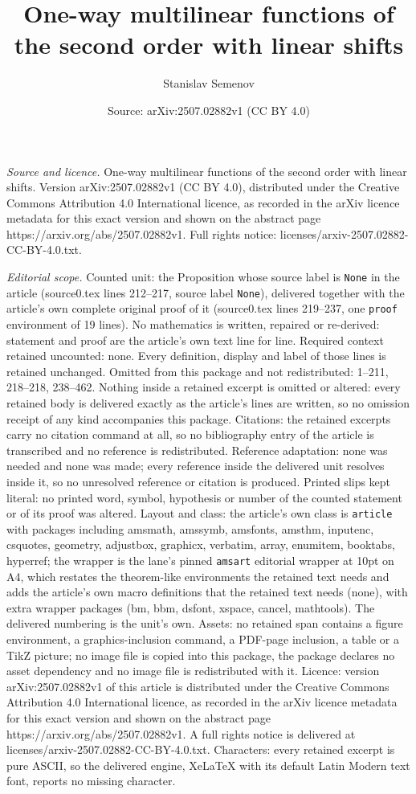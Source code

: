 \documentclass[10pt,a4paper]{amsart}
\title[One-way multilinear functions of the second order with linea]{One-way multilinear functions of the second order with linear shifts}
\author{Stanislav Semenov}
\date{Source: arXiv:2507.02882v1 (CC BY 4.0)}
\begin{document}
\maketitle

\noindent\emph{Source and licence.} One-way multilinear functions of the second order with linear shifts. Version arXiv:2507.02882v1 (CC BY 4.0), distributed under the Creative Commons Attribution 4.0 International licence, as recorded in the arXiv licence metadata for this exact version and shown on the abstract page https://arxiv.org/abs/2507.02882v1. Full rights notice: licenses/arxiv-2507.02882-CC-BY-4.0.txt.\par\smallskip

\noindent\textit{Editorial scope.} Counted unit: the Proposition whose source label is \texttt{None} in the article (source0.tex lines 212--217, source label \texttt{None}), delivered together with the article's own complete original proof of it (source0.tex lines 219--237, one \texttt{proof} environment of 19 lines). No mathematics is written, repaired or re-derived: statement and proof are the article's own text line for line. Required context retained uncounted: none. Every definition, display and label of those lines is retained unchanged. Omitted from this package and not redistributed: 1--211, 218--218, 238--462. Nothing inside a retained excerpt is omitted or altered: every retained body is delivered exactly as the article's lines are written, so no omission receipt of any kind accompanies this package. Citations: the retained excerpts carry no citation command at all, so no bibliography entry of the article is transcribed and no reference is redistributed. Reference adaptation: none was needed and none was made; every reference inside the delivered unit resolves inside it, so no unresolved reference or citation is produced. Printed slips kept literal: no printed word, symbol, hypothesis or number of the counted statement or of its proof was altered. Layout and class: the article's own class is \texttt{article} with packages including amsmath, amssymb, amsfonts, amsthm, inputenc, csquotes, geometry, adjustbox, graphicx, verbatim, array, enumitem, booktabs, hyperref; the wrapper is the lane's pinned \texttt{amsart} editorial wrapper at 10pt on A4, which restates the theorem-like environments the retained text needs and adds the article's own macro definitions that the retained text needs (none), with extra wrapper packages (bm, bbm, dsfont, xspace, cancel, mathtools). The delivered numbering is the unit's own. Assets: no retained span contains a figure environment, a graphics-inclusion command, a PDF-page inclusion, a table or a TikZ picture; no image file is copied into this package, the package declares no asset dependency and no image file is redistributed with it. Licence: version arXiv:2507.02882v1 of this article is distributed under the Creative Commons Attribution 4.0 International licence, as recorded in the arXiv licence metadata for this exact version and shown on the abstract page https://arxiv.org/abs/2507.02882v1. A full rights notice is delivered at licenses/arxiv-2507.02882-CC-BY-4.0.txt. Characters: every retained excerpt is pure ASCII, so the delivered engine, XeLaTeX with its default Latin Modern text font, reports no missing character.
\end{document}
